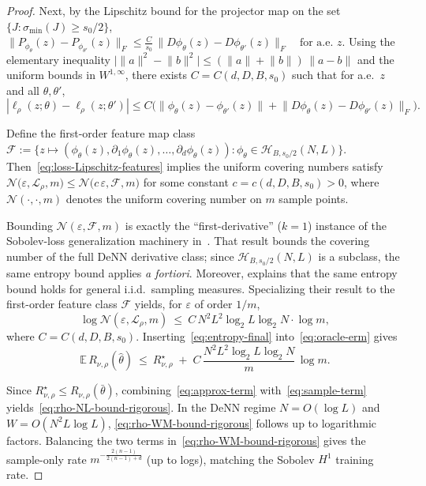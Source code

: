 \documentclass[11pt]{article}
\newcommand{\E}{\mathbb{E}}
\newcommand{\cH}{\mathcal{H}}
\newcommand{\cN}{\mathcal{N}}
\newcommand{\norm}[1]{\lVert#1\rVert}
\newcommand{\abs}[1]{|#1|}
\newcommand{\sigmin}{\sigma_{\min}}
\begin{document}
\begin{proof}
Next, by the Lipschitz bound for the projector map on the set
$\{J:\sigmin(J)\ge s_0/2\}$,
  $\norm{P_{\phi_\theta}(z)-P_{\phi_{\theta'}}(z)}_F
  \le \frac{C}{s_0}\,
    \norm{D\phi_\theta(z)-D\phi_{\theta'}(z)}_F
  \quad\text{for a.e. }z$.
Using the elementary inequality
$\big|\norm{a}^2-\norm{b}^2\big|
 \le (\norm{a}+\norm{b})\,\norm{a-b}$
and the uniform bounds in $W^{1,\infty}$, there exists
$C=C(d,D,B,s_0)$ such that for a.e.\ $z$ and all
$\theta,\theta'$,
\begin{equation}\label{eq:loss-Lipschitz-features}
  \abs{\ell_\rho(z;\theta)-\ell_\rho(z;\theta')}
  \le
  C\Big(\norm{\phi_\theta(z)-\phi_{\theta'}(z)}
       +\norm{D\phi_\theta(z)-D\phi_{\theta'}(z)}_F\Big).
\end{equation}

Define the first-order feature map class
  $\mathcal F
  :=\Big\{z\mapsto
    (\phi_\theta(z),
     \partial_1\phi_\theta(z),\dots,
     \partial_d\phi_\theta(z)):
    \phi_\theta\in\cH_{B,s_0/2}(N,L)\Big\}$.
Then~\eqref{eq:loss-Lipschitz-features} implies the uniform covering
numbers satisfy
$\cN\big(\varepsilon,\mathcal L_\rho,m\big) \le \cN\big(c\,\varepsilon,\mathcal F,m\big)$
for some constant $c=c(d,D,B,s_0)>0$, where
$\cN(\cdot,\cdot,m)$ denotes the uniform covering number on
$m$ sample points.


Bounding $\cN(\varepsilon,\mathcal F,m)$ is exactly the
``first-derivative'' ($k{=}1$) instance of the Sobolev-loss
generalization machinery
in~\cite[Theorem~3.2]{yang2025deeperwiderperspectiveoptimal}.
That result bounds the covering number of the full DeNN
derivative class; since
$\cH_{B,s_0/2}(N,L)$ is a subclass, the same entropy
bound applies \emph{a fortiori}.
Moreover, \cite[Remark~3.1]{yang2025deeperwiderperspectiveoptimal}
explains that the same entropy bound holds for general i.i.d.\
sampling measures.
Specializing their result to the first-order feature class
$\mathcal F$ yields, for $\varepsilon$ of order $1/m$,
\begin{equation}\label{eq:entropy-final}
  \log \cN(\varepsilon,\mathcal L_\rho,m)
  \ \le\
  C\,N^2L^2\log_2 L\log_2 N\cdot \log m,
\end{equation}
where $C=C(d,D,B,s_0)$.
Inserting~\eqref{eq:entropy-final} into~\eqref{eq:oracle-erm} gives
\begin{equation}\label{eq:sample-term}
  \E\,R_{\nu,\rho}(\hat\theta)
  \ \le\
  R_{\nu,\rho}^\star
  \;+\;
  C\,\frac{N^2L^2\log_2 L\log_2 N}{m}\,\log m.
\end{equation}


Since $R_{\nu,\rho}^\star\le R_{\nu,\rho}(\bar\theta)$,
combining~\eqref{eq:approx-term} with~\eqref{eq:sample-term}
yields~\eqref{eq:rho-NL-bound-rigorous}.  In the DeNN regime
$N=O(\log L)$ and $W=O(N^2L\log L)$,
\eqref{eq:rho-WM-bound-rigorous} follows up to logarithmic factors.
Balancing the two terms in~\eqref{eq:rho-WM-bound-rigorous} gives the
sample-only rate $m^{-\frac{2(n-1)}{2(n-1)+d}}$ (up to logs),
matching the Sobolev $H^1$ training rate.
\end{proof}
\end{document}
